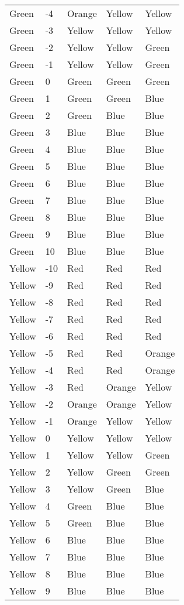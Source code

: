 \documentclass[
]{article}
\begin{document}
\begin{longtable}[]{@{}lllll@{}}
Green & -4 & Orange & Yellow & Yellow \\
Green & -3 & Yellow & Yellow & Yellow \\
Green & -2 & Yellow & Yellow & Green \\
Green & -1 & Yellow & Yellow & Green \\
Green & 0 & Green & Green & Green \\
Green & 1 & Green & Green & Blue \\
Green & 2 & Green & Blue & Blue \\
Green & 3 & Blue & Blue & Blue \\
Green & 4 & Blue & Blue & Blue \\
Green & 5 & Blue & Blue & Blue \\
Green & 6 & Blue & Blue & Blue \\
Green & 7 & Blue & Blue & Blue \\
Green & 8 & Blue & Blue & Blue \\
Green & 9 & Blue & Blue & Blue \\
Green & 10 & Blue & Blue & Blue \\
Yellow & -10 & Red & Red & Red \\
Yellow & -9 & Red & Red & Red \\
Yellow & -8 & Red & Red & Red \\
Yellow & -7 & Red & Red & Red \\
Yellow & -6 & Red & Red & Red \\
Yellow & -5 & Red & Red & Orange \\
Yellow & -4 & Red & Red & Orange \\
Yellow & -3 & Red & Orange & Yellow \\
Yellow & -2 & Orange & Orange & Yellow \\
Yellow & -1 & Orange & Yellow & Yellow \\
Yellow & 0 & Yellow & Yellow & Yellow \\
Yellow & 1 & Yellow & Yellow & Green \\
Yellow & 2 & Yellow & Green & Green \\
Yellow & 3 & Yellow & Green & Blue \\
Yellow & 4 & Green & Blue & Blue \\
Yellow & 5 & Green & Blue & Blue \\
Yellow & 6 & Blue & Blue & Blue \\
Yellow & 7 & Blue & Blue & Blue \\
Yellow & 8 & Blue & Blue & Blue \\
Yellow & 9 & Blue & Blue & Blue \\

\end{longtable}
\end{document}
